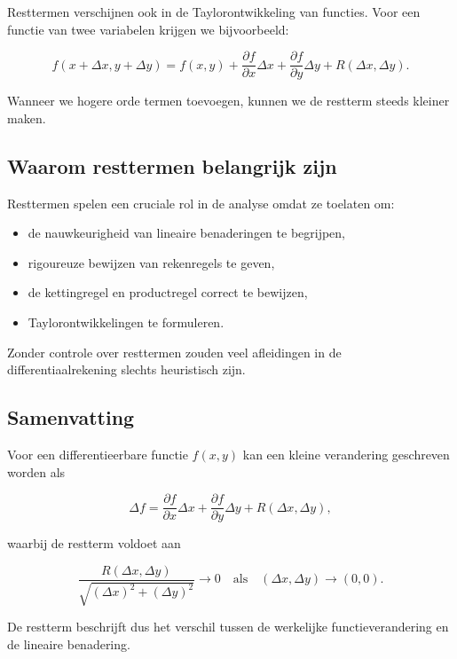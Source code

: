 \documentclass[11pt,a4paper]{article}
\begin{document}
    Resttermen verschijnen ook in de Taylorontwikkeling van functies.
    Voor een functie van twee variabelen krijgen we bijvoorbeeld:

    \[
        f(x+\Delta x,y+\Delta y)
        =
        f(x,y)
        +
        \frac{\partial f}{\partial x}\Delta x
        +
        \frac{\partial f}{\partial y}\Delta y
        +
        R(\Delta x,\Delta y).
    \]

    Wanneer we hogere orde termen toevoegen, kunnen we de restterm steeds kleiner
    maken.

    \subsection{Waarom resttermen belangrijk zijn}

    Resttermen spelen een cruciale rol in de analyse omdat ze toelaten om:

    \begin{itemize}
        \item de nauwkeurigheid van lineaire benaderingen te begrijpen,
        \item rigoureuze bewijzen van rekenregels te geven,
        \item de kettingregel en productregel correct te bewijzen,
        \item Taylorontwikkelingen te formuleren.
    \end{itemize}

    Zonder controle over resttermen zouden veel afleidingen in de differentiaalrekening
    slechts heuristisch zijn.

    \subsection{Samenvatting}

    Voor een differentieerbare functie $f(x,y)$ kan een kleine verandering geschreven
    worden als

    \[
        \Delta f
        =
        \frac{\partial f}{\partial x}\Delta x
        +
        \frac{\partial f}{\partial y}\Delta y
        +
        R(\Delta x,\Delta y),
    \]

    waarbij de restterm voldoet aan

    \[
        \frac{R(\Delta x,\Delta y)}
        {\sqrt{(\Delta x)^2+(\Delta y)^2}}
        \to 0
        \quad \text{als} \quad
        (\Delta x,\Delta y)\to(0,0).
    \]

    De restterm beschrijft dus het verschil tussen de werkelijke functieverandering
    en de lineaire benadering.
\end{document}

